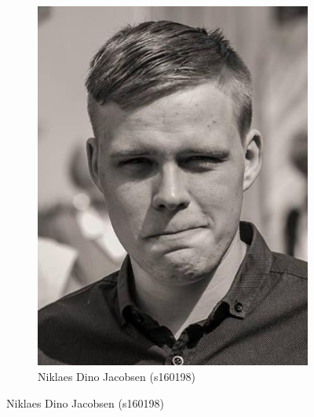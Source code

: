 \begin{figure}[H]
\begin{subfigure}{0.25\textwidth}
		\includegraphics[width=\linewidth]{graphics/members/niklaes}
		\caption*{Niklaes Dino Jacobsen (s160198)}
	\end{subfigure}

	\medskip
	\vspace{1cm}


\end{figure}
